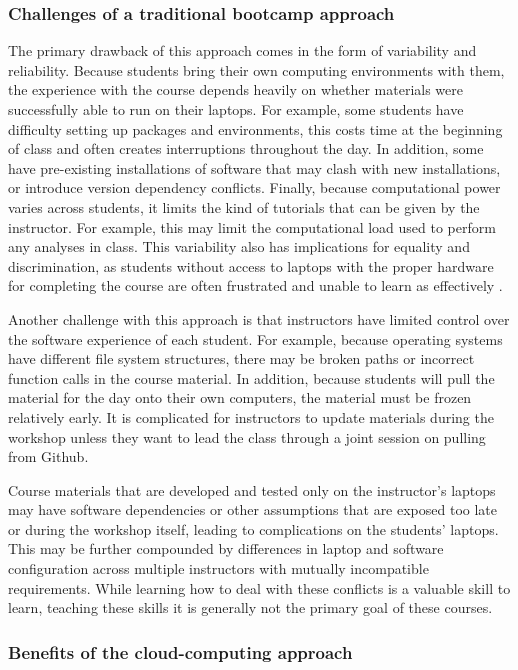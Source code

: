\subsubsection{Challenges of a traditional bootcamp approach}

The primary drawback of this approach comes in the form of variability and
reliability. Because students bring their own computing environments with them,
the experience with the course depends heavily on whether materials were
successfully able to run on their laptops. For example, some students have
difficulty setting up packages and environments, this costs time at the
beginning of class and often creates interruptions throughout the day. In
addition, some have pre-existing installations of software that may clash with
new installations, or introduce version dependency conflicts. Finally, because
computational power varies across students, it limits the kind of tutorials that
can be given by the instructor. For example, this may limit the computational
load used to perform any analyses in class. This variability also has
implications for equality and discrimination, as students without access to
laptops with the proper hardware for completing the course are often frustrated
and unable to learn as effectively \cite{clark-proc-scipy-2014}.

Another challenge with this approach is that instructors have limited control
over the software experience of each student. For example, because operating
systems have different file system structures, there may be broken paths or
incorrect function calls in the course material. In addition, because students
will pull the material for the day onto their own computers, the material must
be frozen relatively early. It is complicated for instructors to update
materials during the workshop unless they want to lead the class through a joint
session on pulling from Github.

Course materials that are developed and tested only on the instructor's laptops
may have software dependencies or other assumptions that are exposed too late or
during the workshop itself, leading to complications on the students'
laptops. This may be further compounded by differences in laptop and software
configuration across multiple instructors with mutually incompatible
requirements. While learning how to deal with these conflicts is a valuable
skill to learn, teaching these skills it is generally not the primary goal of
these courses.

\subsubsection{Benefits of the cloud-computing approach}

